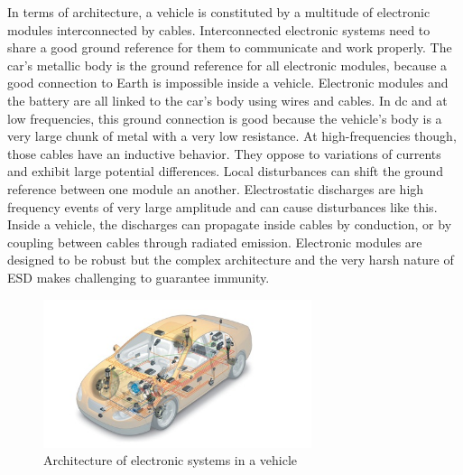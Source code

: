 In terms of architecture, a vehicle is constituted by a multitude of electronic modules interconnected by cables.
Interconnected electronic systems need to share a good ground reference for them to communicate and work properly.
The car's metallic body is the ground reference for all electronic modules, because a good connection to Earth is impossible inside a vehicle.
Electronic modules and the battery are all linked to the car's body using wires and cables.
In \gls{dc} and at low frequencies, this ground connection is good because the vehicle's body is a very large chunk of metal with a very low resistance.
At high-frequencies though, those cables have an inductive behavior.
They oppose to variations of currents and exhibit large potential differences.
Local disturbances can shift the ground reference between one module an another.
Electrostatic discharges are high frequency events of very large amplitude and can cause disturbances like this.
Inside a vehicle, the discharges can propagate inside cables by conduction, or by coupling between cables through radiated emission.
Electronic modules are designed to be robust but the complex architecture and the very harsh nature of ESD makes challenging to guarantee immunity.

\begin{figure}[!h]
  \centering
  \includegraphics[width=0.7\textwidth]{src/1/figures/systemintegration_01_uv-data.jpg}
  \caption{Architecture of electronic systems in a vehicle \cite{car-architecture}}
  \label{fig:car-architecture}
\end{figure}

